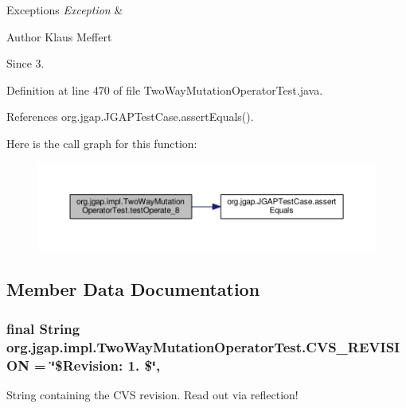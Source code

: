 \begin{DoxyExceptions}{Exceptions}
{\em Exception} & \\
\hline
\end{DoxyExceptions}
\begin{DoxyAuthor}{Author}
Klaus Meffert 
\end{DoxyAuthor}
\begin{DoxySince}{Since}
3. 
\end{DoxySince}


Definition at line 470 of file Two\-Way\-Mutation\-Operator\-Test.\-java.



References org.\-jgap.\-J\-G\-A\-P\-Test\-Case.\-assert\-Equals().



Here is the call graph for this function\-:
\nopagebreak
\begin{figure}[H]
\begin{center}
\leavevmode
\includegraphics[width=350pt]{classorg_1_1jgap_1_1impl_1_1_two_way_mutation_operator_test_a3ee4f4d7d87956b8242bad4d2f185718_cgraph}
\end{center}
\end{figure}




\subsection{Member Data Documentation}
\hypertarget{classorg_1_1jgap_1_1impl_1_1_two_way_mutation_operator_test_a97ea6c6f97bc4a9b52e6647d17371eba}{
\subsubsection[{C\-V\-S\-\_\-\-R\-E\-V\-I\-S\-I\-O\-N}]{\setlength{\rightskip}{0pt plus 5cm}final String org.\-jgap.\-impl.\-Two\-Way\-Mutation\-Operator\-Test.\-C\-V\-S\-\_\-\-R\-E\-V\-I\-S\-I\-O\-N = \char`\"{}\$Revision\-: 1. \$\char`\"{}\hspace{0.3cm}{\ttfamily [static]}, {\ttfamily [private]}}}\label{classorg_1_1jgap_1_1impl_1_1_two_way_mutation_operator_test_a97ea6c6f97bc4a9b52e6647d17371eba}
String containing the C\-V\-S revision. Read out via reflection! 

